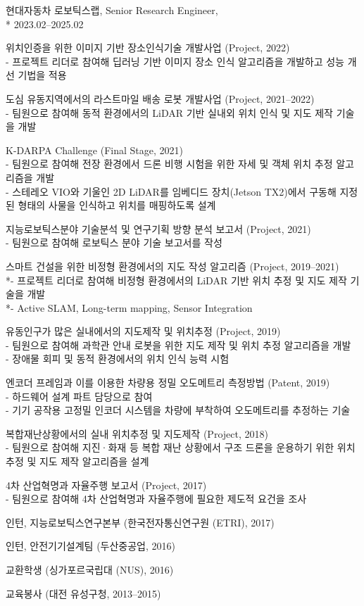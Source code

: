 \documentclass[margin]{res}
\begin{document}
\begin{resume}
		\par 현대자동차 로보틱스랩, Senior Research Engineer,\\*
		2023.02--2025.02

		\par	위치인증을 위한 이미지 기반 장소인식기술 개발사업 (Project, 2022) 
		\\- 프로젝트 리더로 참여해 딥러닝 기반 이미지 장소 인식 알고리즘을 개발하고 성능 개선 기법을 적용
		\par	도심 유동지역에서의 라스트마일 배송 로봇 개발사업 (Project, 2021--2022) 
		\\- 팀원으로 참여해 동적 환경에서의 LiDAR 기반 실내외 위치 인식 및 지도 제작 기술을 개발
		\par	K-DARPA Challenge (Final Stage, 2021)
		\\-	팀원으로 참여해 전장 환경에서 드론 비행 시험을 위한 자세 및 객체 위치 추정 알고리즘을 개발
		\\-	스테레오 VIO와 기울인 2D LiDAR를 임베디드 장치(Jetson TX2)에서 구동해 지정된 형태의 사물을 인식하고 위치를 매핑하도록 설계
		\par	지능로보틱스분야 기술분석 및 연구기획 방향 분석 보고서 (Project, 2021)
		\\-	팀원으로 참여해 로보틱스 분야 기술 보고서를 작성
		\par	스마트 건설을 위한 비정형 환경에서의 지도 작성 알고리즘 (Project, 2019--2021)
		\\*- 프로젝트 리더로 참여해 비정형 환경에서의 LiDAR 기반 위치 추정 및 지도 제작 기술을 개발
		\\*-	Active SLAM, Long-term mapping, Sensor Integration
		\par	유동인구가 많은 실내에서의 지도제작 및 위치추정 (Project, 2019)
		\\-	팀원으로 참여해 과학관 안내 로봇을 위한 지도 제작 및 위치 추정 알고리즘을 개발
		\\-	장애물 회피 및 동적 환경에서의 위치 인식 능력 시험
		\par	엔코더 프레임과 이를 이용한 차량용 정밀 오도메트리 측정방법 (Patent, 2019)
		\\-	하드웨어 설계 파트 담당으로 참여
		\\- 기기 공작용 고정밀 인코더 시스템을 차량에 부착하여 오도메트리를 추정하는 기술
		\par	복합재난상황에서의 실내 위치추정 및 지도제작 (Project, 2018)
		\\-	팀원으로 참여해 지진·화재 등 복합 재난 상황에서 구조 드론을 운용하기 위한 위치 추정 및 지도 제작 알고리즘을 설계
		\par	4차 산업혁명과 자율주행 보고서 (Project, 2017)
		\\-	팀원으로 참여해 4차 산업혁명과 자율주행에 필요한 제도적 요건을 조사
		\par	인턴, 지능로보틱스연구본부 (한국전자통신연구원 (ETRI), 2017)
		\par	인턴, 안전기기설계팀 (두산중공업, 2016)
		\par	교환학생 (싱가포르국립대 (NUS), 2016)
		\par	교육봉사 (대전 유성구청, 2013--2015)
		

\end{resume}
\end{document}
